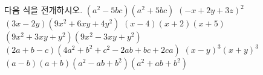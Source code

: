 다음 식을 전개하시오.
 $(a^2-5bc)(a^2+5bc)$
 $(-x+2y+3z)^2$
 $(3x-2y)(9x^2+6xy+4y^2)$
 $(x-4)(x+2)(x+5)$
 $(9x^2+3xy+y^2)(9x^2-3xy+y^2)$
 $(2a+b-c)(4a^2+b^2+c^2-2ab+bc+2ca)$
 $(x-y)^3(x+y)^3$
 $(a-b)(a+b)(a^2-ab+b^2)(a^2+ab+b^2)$
